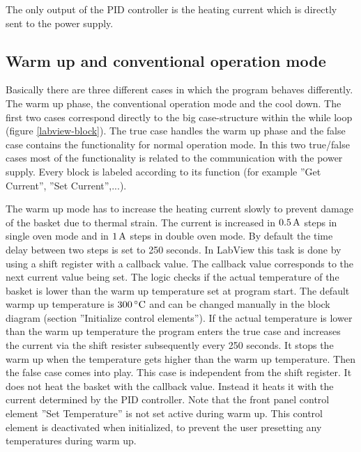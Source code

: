 \documentclass[parskip,12pt,headsepline,a4paper] {scrbook}
\begin{document}
The only output of the PID controller is the heating current which is directly sent to the power supply. %

\subsection{Warm up and conventional operation mode}
\vspace{-1\baselineskip}
Basically there are three different cases in which the program behaves differently. The warm up phase, the conventional operation mode and the cool down. The first two cases correspond directly to the big case-structure within the while loop (figure \ref{labview-block}). The true case handles the warm up phase and the false case contains the functionality for normal operation mode. In this two true/false cases most of the functionality is related to the communication with the power supply. Every block is labeled according to its function (for example ''Get Current'', ''Set Current'',...).

The warm up mode has to increase the heating current slowly to prevent damage of the basket due to thermal strain. The current is increased in $\unit[0.5]{A}$ steps in single oven mode and in $\unit[1]{A}$ steps in double oven mode. By default the time delay between two steps is set to 250 seconds. In LabView this task is done by using a shift register with a callback value. The callback value corresponds to the next current value being set. The logic checks if the actual temperature of the basket is lower than the warm up temperature set at program start. The default warmp up temperature is $\unit[300]{^\circ C}$ and can be changed manually in the block diagram (section ''Initialize control elements''). If the actual temperature is lower than the warm up temperature the program enters the true case and increases the current via the shift resister subsequently every 250 seconds. It stops the warm up when the temperature gets higher than the warm up temperature. Then the false case comes into play. This case is independent from the shift register. It does not heat the basket with the callback value. Instead it heats it with the current determined by the PID controller. Note that the front panel control element ''Set Temperature'' is not set active during warm up. This control element is deactivated when initialized, to prevent the user presetting any temperatures during warm up.
\end{document}
